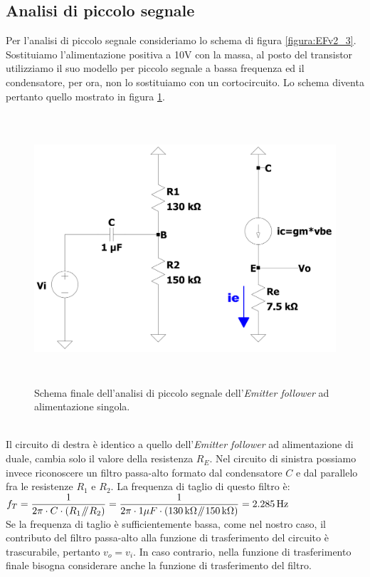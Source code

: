 \documentclass{report}
\newcommand{\parallelsum}{\mathbin{\!/\mkern-5mu/\!}}
\begin{document}
\subsection{Analisi di piccolo segnale}  
Per l'analisi di piccolo segnale consideriamo lo schema di figura \ref{figura:EFv2_3}. Sostituiamo l'alimentazione positiva a 10V con la massa, al posto del transistor utilizziamo il suo modello per piccolo segnale a bassa frequenza ed il condensatore, per ora, non lo sostituiamo con un cortocircuito. Lo schema diventa pertanto quello mostrato in figura \ref{figura:EFv2_3_ps}.
\begin{figure}[h]
\centering
\includegraphics[height=10cm]{immagini/EFv2_3_ps}
\caption{Schema finale dell'analisi di piccolo segnale dell'\textit{Emitter follower} ad alimentazione singola.}
\label{figura:EFv2_3_ps}
\end{figure}
\\Il circuito di destra è identico a quello dell'\textit{Emitter follower} ad alimentazione di duale, cambia solo il valore della resistenza $R_E$. Nel circuito di sinistra possiamo invece riconoscere un filtro passa-alto formato dal condensatore $C$ e dal parallelo fra le resistenze $R_1$ e $R_2$. La frequenza di taglio di questo filtro è:
\\[2pt]\indent $\displaystyle{f_T=\frac{1}{2\pi\cdot C\cdot (R_1\parallelsum R_2)}=\frac{1}{2\pi\cdot 1\mu F\cdot(\SI{130}{k\ohm}\parallelsum\SI{150}{k\ohm})}=\SI{2.285}{\hertz}}$
\\[2pt]Se la frequenza di taglio è sufficientemente bassa, come nel nostro caso, il contributo del filtro passa-alto alla funzione di trasferimento del circuito è trascurabile, pertanto $v_o=v_i$. In caso contrario, nella funzione di trasferimento finale bisogna considerare anche la funzione di trasferimento del filtro.
\end{document}
